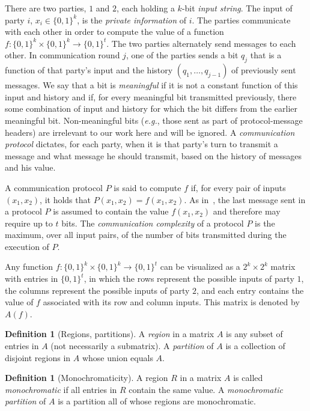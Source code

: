 \documentclass{article}
\theoremstyle{theorem}
\theoremstyle{definition}
\newtheorem{definition}[theorem]{Definition}
\theoremstyle{remark}
\begin{document}
There are two parties, $1$ and $2$, each holding a $k$-bit
\emph{input string}. The input of party $i$, $x_i\in\{0,1\}^k$, is
the \emph{private information} of $i$. The parties communicate with
each other in order to compute the value of a function
$f:\{0,1\}^k\times \{0,1\}^k\rightarrow \{0,1\}^t$. The two parties
alternately send messages to each other. In communication round $j$, one of the parties sends a bit $q_j$ that is a
function of that party's input and the history $(q_1,\ldots,q_{j-1})$ of previously sent messages.  We say that a bit is \emph{meaningful} if it is not a constant function of this input and history and if, for every meaningful bit transmitted previously, there some combination of input and history for which the bit differs from the earlier meaningful bit.  Non-meaningful bits (\emph{e.g.}, those sent as part of protocol-message headers) are irrelevant to our work here and will be ignored.  A \emph{communication
protocol} dictates, for each party, when it is that party's turn to
transmit a message and what message he should transmit, based on the
history of messages and his value.

A communication protocol $P$ is said to compute $f$ if, for every
pair of inputs $(x_1,x_2)$, it holds that $P(x_1,x_2)=f(x_1,x_2)$. As
in~\cite{K92}, the last message sent in a protocol $P$ is assumed to
contain the value $f(x_1,x_2)$ and therefore may require up to $t$
bits. The \emph{communication complexity} of a protocol $P$ is the
maximum, over all input pairs, of the number of bits transmitted during the execution of $P$.

Any function $f:\{0,1\}^k\times \{0,1\}^k\rightarrow\{0,1\}^t$ can
be visualized as a $2^k\times 2^k$ matrix with entries in
$\{0,1\}^t$, in which the rows represent the possible inputs of
party $1$, the columns represent the possible inputs of party $2$,
and each entry contains the value of $f$ associated with its row and
column inputs. This matrix is denoted by $A(f)$.

\begin{definition}[Regions, partitions]
A \emph{region} in a matrix $A$ is any subset of entries in $A$ (not
necessarily a submatrix). A \emph{partition} of $A$ is a collection
of disjoint regions in $A$ whose union equals $A$.
\end{definition}

\begin{definition}[Monochromaticity]
A region $R$ in a matrix $A$ is called \emph{monochromatic} if all
entries in $R$ contain the same value. A \emph{monochromatic
partition} of $A$ is a partition all of whose regions are
monochromatic.
\end{definition}
\end{document}
